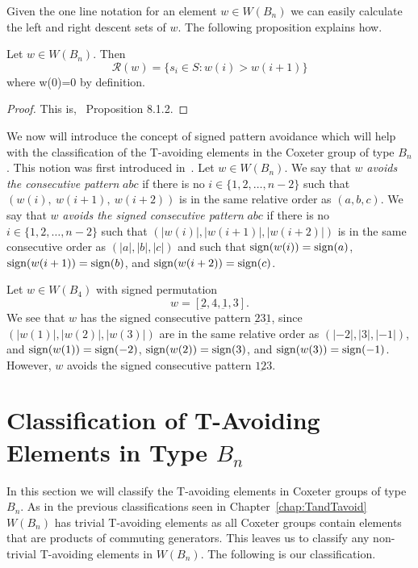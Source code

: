 Given the one line notation for an element $w \in W(B_n)$ we can easily calculate the left and right descent sets of $w$. The following proposition explains how.

\begin{proposition}\label{prop:descent}
Let $w \in W(B_n)$. Then 
\[ \mathcal{R}(w)=\{s_i \in S: w(i) > w(i+1)\} \]
where w(0)=0 by definition.
\begin{proof}
	This is,~\cite{Bjorner2005} Proposition 8.1.2.
\end{proof}
\end{proposition}

We now will introduce the concept of signed pattern avoidance which will help with the classification of the T-avoiding elements in the Coxeter group of type $B_n$. This notion was first introduced in~\cite{Gern2013a}. Let $w \in W(B_n)$. We say that $w$ \emph{avoids the consecutive pattern} $abc$ if there is no $i \in \{1,2, \ldots, n-2\}$ such that $(w(i),~w(i+1),~w(i+2))$ is in the same relative order as $(a,b,c).$ We say that $w$ \emph{avoids the signed consecutive pattern} $abc$ if there is no $i \in \{1,2, \ldots, n-2\}$ such that $\left(|w(i)|, |w(i+1)|, |w(i+2)|\right)$ is in the same consecutive order as $\left(|a|, |b|, |c| \right)$ and such that $\mathrm{sign}(w(i))=\mathrm{sign}(a)$, $\mathrm{sign}(w(i+1))=\mathrm{sign}(b)$, and $\mathrm{sign}(w(i+2))=\mathrm{sign}(c)$.

\begin{example}
Let $w \in W(B_4)$ with signed permutation \[w=[\underbar{2},4, \underbar{1}, 3].\] We see that $w$ has the signed consecutive pattern $\underbar{2} 3 \underbar{1}$, since $(|w(1)|, |w(2)|, |w(3)|)$ are in the same relative order as $(|-2|, |3|, |-1|)$, and $\mathrm{sign}(w(1))=\mathrm{sign}(-2)$, $\mathrm{sign}(w(2))=\mathrm{sign}(3)$, and $\mathrm{sign}(w(3))=\mathrm{sign}(-1)$. However, $w$ avoids the signed consecutive pattern $1\underbar{2}3$.
\end{example}

\section{Classification of T-Avoiding Elements in Type $B_n$}\label{sec:TAB}

In this section we will classify the T-avoiding elements in Coxeter groups of type $B_n$. As in the previous classifications seen in Chapter~\ref{chap:TandTavoid} $W(B_n)$ has trivial T-avoiding elements as all Coxeter groups contain elements that are products of commuting generators. This leaves us to classify any non-trivial T-avoiding elements in $W(B_n)$. The following is our classification.


